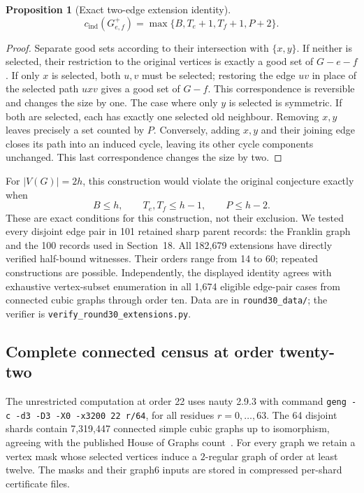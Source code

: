 \documentclass[11pt]{article}
\newtheorem{proposition}[theorem]{Proposition}
\newcommand{\cind}{c_{\mathrm{ind}}}
\begin{document}
\begin{proposition}[Exact two-edge extension identity]
\label{prop:two-edge-extension}
\[
 \cind(G_{e,f}^{+})=\max\{B,T_e+1,T_f+1,P+2\}.
\]
\end{proposition}
\begin{proof}
Separate good sets according to their intersection with $\{x,y\}$.
If neither is selected, their restriction to the original vertices is
exactly a good set of $G-e-f$. If only $x$ is selected, both $u,v$
must be selected; restoring the edge $uv$ in place of the selected
path $uxv$ gives a good set of $G-f$. This correspondence is reversible
and changes the size by one. The case where only $y$ is selected is
symmetric. If both are selected, each has exactly one selected old
neighbour. Removing $x,y$ leaves precisely a set counted by $P$.
Conversely, adding $x,y$ and their joining edge closes its path into
an induced cycle, leaving its other cycle components unchanged. This
last correspondence changes the size by two.
\end{proof}

For $|V(G)|=2h$, this construction would violate the original
conjecture exactly when
\[
 B\leq h,\qquad T_e,T_f\leq h-1,\qquad P\leq h-2.
\]
These are exact conditions for this construction, not their exclusion.
We tested every disjoint edge pair in 101 retained sharp parent records:
the Franklin graph and the 100 records used in Section~18. All 182,679
extensions have directly verified half-bound witnesses. Their orders
range from 14 to 60; repeated constructions are possible. Independently,
the displayed identity agrees with exhaustive vertex-subset enumeration
in all 1,674 eligible edge-pair cases from connected cubic graphs through
order ten. Data are in \texttt{round30\_data/}; the verifier is
\texttt{verify\_round30\_extensions.py}.

\subsection{Complete connected census at order twenty-two}
The unrestricted computation at order 22 uses nauty 2.9.3 with command
\texttt{geng -c -d3 -D3 -X0 -x3200 22 r/64}, for all residues
$r=0,\ldots,63$. The 64 disjoint shards contain 7,319,447 connected
simple cubic graphs up to isomorphism, agreeing with the published
House of Graphs count~\cite{HoGCubic}. For every graph we retain a
vertex mask whose selected vertices induce a $2$-regular graph of
order at least twelve. The masks and their graph6 inputs are stored
in compressed per-shard certificate files.
\end{document}

